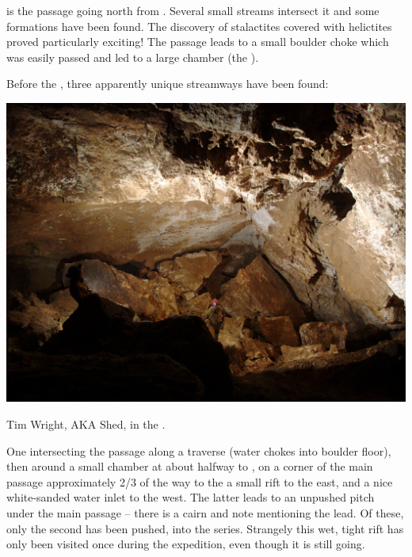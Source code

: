  is the passage going north from
. Several small streams intersect it and some formations
have been found. The discovery of stalactites covered with helictites
proved particularly exciting! The passage leads to a small boulder choke
which was easily passed and led to a large chamber (the ).

Before the , three apparently unique streamways have been found:


\begin{pagefigure}
\checkoddpage \ifoddpage \forcerectofloat \else \forceversofloat \fi
   \centering
\includegraphics[width = \textwidth]{2010/expo_findings/20100731-21-53-00-Jarvist Frost-Canon G5-CRW_0402-Albert Hall - Prince Consort Road--orig.jpg}
\caption{Tim Wright, AKA Shed, in the \protect{}. } \label{Albert Hall}
\end{pagefigure}


One intersecting the passage along a traverse (water chokes into boulder floor), then around a small chamber at about halfway to , on a corner of the main passage approximately 2/3 of the way to
the  a small rift to the east, and a nice white-sanded water inlet to the west. The latter leads to an unpushed pitch under the main passage -- there is a cairn and note mentioning the lead. Of these,
only the second has been pushed, into the  series. Strangely this wet, tight rift has only been visited once during the
expedition, even though it is still going.

